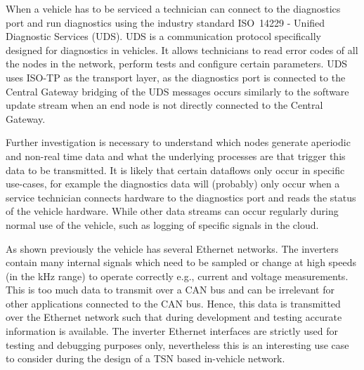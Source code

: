 When a vehicle has to be serviced a technician can connect to the diagnostics port and run diagnostics using the industry standard ISO~14229 - Unified Diagnostic Services (UDS). UDS is a communication protocol specifically designed for diagnostics in vehicles. It allows technicians to read error codes of all the nodes in the network, perform tests and configure certain parameters. UDS uses ISO-TP as the transport layer, as the diagnostics port is connected to the Central Gateway bridging of the UDS messages occurs similarly to the software update stream when an end node is not directly connected to the Central Gateway.

Further investigation is necessary to understand which nodes generate aperiodic and non-real time data and what the underlying processes are that trigger this data to be transmitted. It is likely that certain dataflows only occur in specific use-cases, for example the diagnostics data will (probably) only occur when a service technician connects hardware to the diagnostics port and reads the status of the vehicle hardware. While other data streams can occur regularly during normal use of the vehicle, such as logging of specific signals in the cloud.

As shown previously the vehicle has several Ethernet networks. The inverters contain many internal signals which need to be sampled or change at high speeds (in the kHz range) to operate correctly e.g., current and voltage measurements. This is too much data to transmit over a CAN bus and can be irrelevant for other applications connected to the CAN bus. Hence, this data is transmitted over the Ethernet network such that during development and testing accurate information is available. The inverter Ethernet interfaces are strictly used for testing and debugging purposes only, nevertheless this is an interesting use case to consider during the design of a TSN based in-vehicle network.
